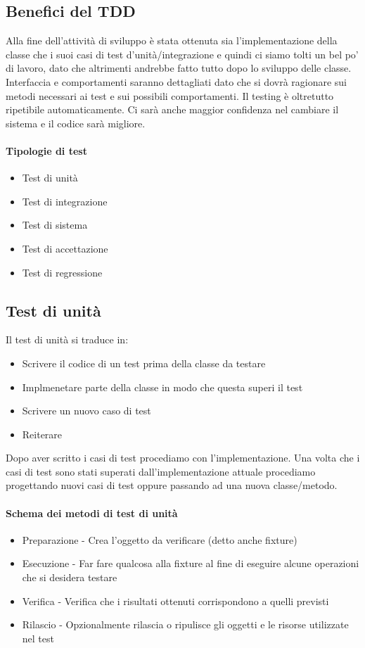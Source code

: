\subsection{Benefici del TDD}
Alla fine dell'attività di sviluppo è stata ottenuta sia l'implementazione della classe che i suoi
casi di test d'unità/integrazione e quindi ci siamo tolti un bel po' di lavoro, dato che
altrimenti andrebbe fatto tutto dopo lo sviluppo delle classe.\\
Interfaccia e comportamenti saranno dettagliati dato che si dovrà ragionare sui
metodi necessari ai test e sui possibili comportamenti. Il testing è oltretutto ripetibile
automaticamente. Ci sarà anche maggior confidenza nel cambiare il sistema e il codice sarà
migliore.
\paragraph*{Tipologie di test}
\begin{itemize}
    \item Test di unità
    \item Test di integrazione
    \item Test di sistema
    \item Test di accettazione
    \item Test di regressione
\end{itemize}
\subsection{Test di unità}
Il test di unità si traduce in:
\begin{itemize}
    \item Scrivere il codice di un test prima della classe da testare
    \item Implmenetare parte della classe in modo che questa superi il test
    \item Scrivere un nuovo caso di test
    \item Reiterare
\end{itemize}
Dopo aver scritto i casi di test procediamo con l'implementazione.
Una volta che i casi di test sono stati superati dall'implementazione attuale procediamo
progettando nuovi casi di test oppure passando ad una nuova classe/metodo.
\paragraph*{Schema dei metodi di test di unità}
\begin{itemize}
    \item Preparazione - Crea l'oggetto da verificare (detto anche fixture)
    \item Esecuzione - Far fare qualcosa alla fixture al fine di eseguire alcune operazioni
    che si desidera testare
    \item Verifica - Verifica che i risultati ottenuti corrispondono a quelli previsti
    \item Rilascio - Opzionalmente rilascia o ripulisce gli oggetti e le risorse utilizzate nel test
\end{itemize}

